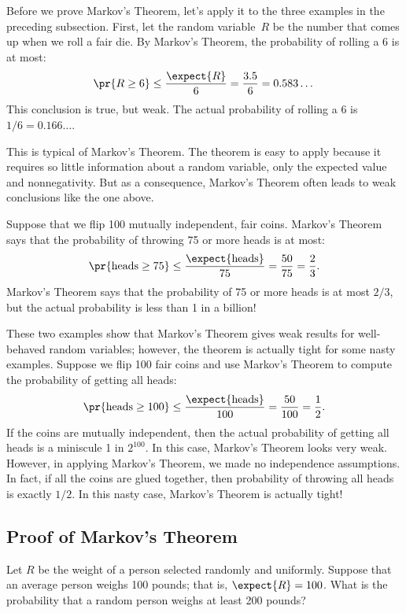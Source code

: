 \begin{editingnotes}

Before we prove Markov's Theorem, let's apply it to the three examples in
the preceding subsection.  First, let the random variable~$R$ be the
number that comes up when we roll a fair die.  By Markov's Theorem, the
probability of rolling a 6 is at most:
\[
\pr{R \geq 6} \leq \frac{\expect{R}}{6} = \frac{3.5}{6} = 0.583\dots
\]
This conclusion is true, but weak.  The actual probability of rolling
a 6 is $1/6 = 0.166\dots$.

This is typical of Markov's Theorem.  The theorem is easy to apply
because it requires so little information about a random variable,
only the expected value and nonnegativity.  But as a consequence,
Markov's Theorem often leads to weak conclusions like the one above.

Suppose that we flip 100 mutually independent, fair coins.  Markov's
Theorem says that the probability of throwing 75 or more heads is at
most:
\[
\pr{\text{heads} \geq 75} \leq \frac{\expect{\text{heads}}}{75} =
\frac{50}{75} = \frac{2}{3}.
\]
Markov's Theorem says that the probability of 75 or more heads is at
most $2/3$, but the actual probability is less than 1 in a
billion!

These two examples show that Markov's Theorem gives weak results for
well-behaved random variables; however, the theorem is actually tight
for some nasty examples.  Suppose we flip 100 fair coins and use
Markov's Theorem to compute the probability of getting all heads:
\[
\pr{\text{heads} \geq 100} \leq \frac{\expect{\text{heads}}}{100} =
\frac{50}{100} = \frac{1}{2}.
\]
If the coins are mutually independent, then the actual probability of
getting all heads is a miniscule 1 in $2^{100}$.  In this case, Markov's
Theorem looks very weak.  However, in applying Markov's Theorem, we made
no independence assumptions.  In fact, if all the coins are glued
together, then probability of throwing all heads is exactly $1/2$.
In this nasty case, Markov's Theorem is actually tight!

\subsection{Proof of Markov's Theorem}

Let $R$ be the weight of a person selected randomly and uniformly.
Suppose that an average person weighs 100 pounds; that is, $\expect{R} =
100$.  What is the probability that a random person weighs at least
200 pounds?


\end{editingnotes}
